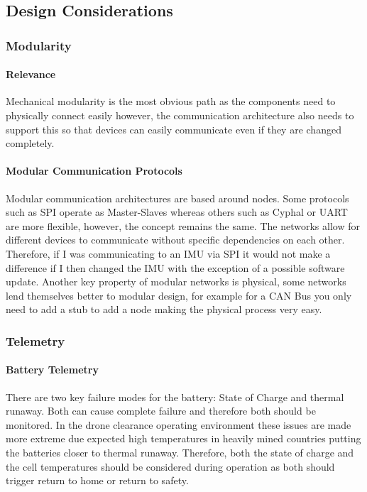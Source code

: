 \subsection{Design Considerations}

\subsubsection{Modularity}
\paragraph{Relevance}
Mechanical modularity is the most obvious path as the components need to physically connect easily however, the communication architecture also needs to support this so that devices can easily communicate even if they are changed completely.
\paragraph{Modular Communication Protocols}
Modular communication architectures are based around nodes. Some protocols such as \gls{SPI} operate as Master-Slaves whereas others such as Cyphal or \gls{UART} are more flexible, however, the concept remains the same. The networks allow for different devices to communicate without specific dependencies on each other. Therefore, if I was communicating to an \gls{IMU} via \gls{SPI} it would not make a difference if I then changed the \gls{IMU} with the exception of a possible software update. Another key property of modular networks is physical, some networks lend themselves better to modular design, for example for a \gls{CAN} Bus you only need to add a stub to add a node making the physical process very easy.

\subsubsection{Telemetry}
\paragraph{Battery Telemetry}
There are two key failure modes for the battery: State of Charge and thermal runaway. Both can cause complete failure and therefore both should be monitored. In the drone clearance operating environment these issues are made more extreme due expected high temperatures in heavily mined countries putting the batteries closer to thermal runaway. Therefore, both the state of charge and the cell temperatures should be considered during operation as both should trigger return to home or return to safety. 
